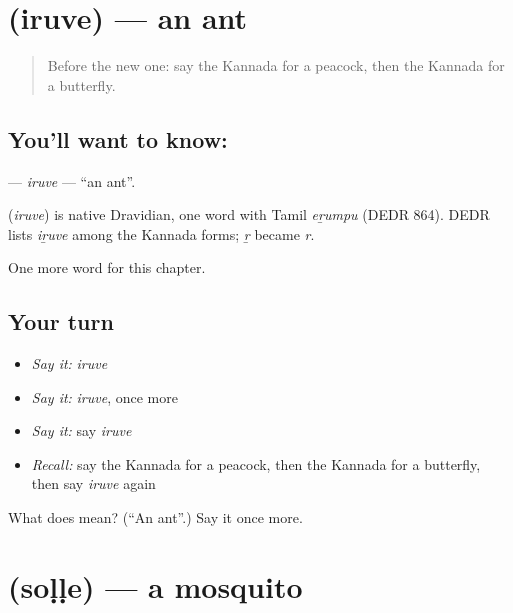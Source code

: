 \section[\texorpdfstring{\kn{ಇರುವೆ} (iruve)}{ಇರುವೆ (iruve)}]{ (iruve) — an ant}

\label{lesson:KA-C132-iruve}



\begin{quote}
Before the new one: say the Kannada for a peacock, then the Kannada for a butterfly.
\end{quote}

\subsection*{You'll want to know: }
\textbf{} — \emph{iruve} — \textquotedblleft{}an ant\textquotedblright{}.

\begin{cousinweb}
\textbf{} (\emph{iruve}) is native Dravidian, one word with Tamil \emph{eṟumpu} (DEDR 864). DEDR lists \emph{iṟuve} among the Kannada forms; \emph{ṟ} became \emph{r}.
\end{cousinweb}

\begin{grammarlens}[title={What you've built}]
One more word for this chapter.
\end{grammarlens}

\subsection*{Your turn}
\begin{itemize}
\raggedright
  \item \emph{Say it:} \emph{iruve}
  \item \emph{Say it:} \emph{iruve}, once more
  \item \emph{Say it:} say \emph{iruve}
  \item \emph{Recall:} say the Kannada for a peacock, then the Kannada for a butterfly, then say \emph{iruve} again
\end{itemize}

\begin{tcolorbox}[breakable,colback=teal!4,colframe=teal!35!black,title={Before you move on}]
What does  mean? (\textquotedblleft{}An ant\textquotedblright{}.) Say it once more.
\end{tcolorbox}
\section[\texorpdfstring{\kn{ಸೊಳ್ಳೆ} (soḷḷe)}{ಸೊಳ್ಳೆ (soḷḷe)}]{ (soḷḷe) — a mosquito}

